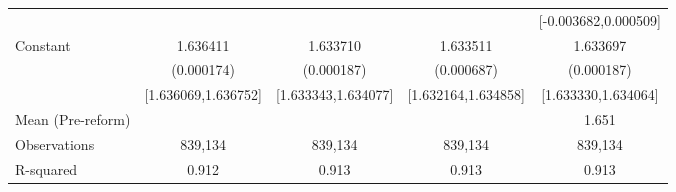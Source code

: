 {\begin{tabular}{l*{4}{c}}
                    &                     &                     &                     &[-0.003682,0.000509]         \\
Constant            &    1.636411\sym{***}&    1.633710\sym{***}&    1.633511\sym{***}&    1.633697\sym{***}\\
                    &  (0.000174)         &  (0.000187)         &  (0.000687)         &  (0.000187)         \\
                    &[1.636069,1.636752]         &[1.633343,1.634077]         &[1.632164,1.634858]         &[1.633330,1.634064]         \\
\midrule
Mean (Pre-reform)   &                     &                     &                     &       1.651         \\
Observations        &     839,134         &     839,134         &     839,134         &     839,134         \\
R-squared           &       0.912         &       0.913         &       0.913         &       0.913         \\
\bottomrule
\end{tabular}
}
